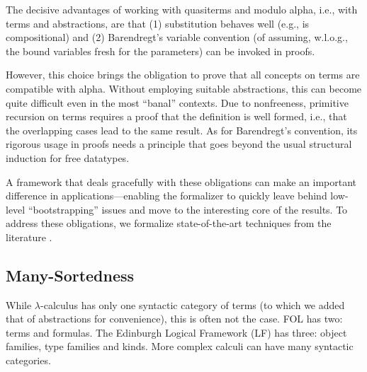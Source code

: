 \documentclass{llncs}
\begin{document}
The decisive advantages of working 
with quasiterms and \abstractions{} modulo alpha, i.e., with terms and abstractions, 
are that 
(1) substitution behaves well (e.g., is compositional) 
and 
(2) Barendregt's variable convention \cite{bar-lam} (of assuming, w.l.o.g.,   
the bound variables fresh for the parameters) can be invoked in proofs. 

%
However, this choice brings the obligation to prove that all concepts on terms 
are compatible with alpha. Without employing suitable abstractions, 
this can become quite difficult 
even in the most ``banal'' contexts. %
Due to nonfreeness, primitive recursion 
on terms requires a proof that the definition is well formed, i.e., that the overlapping 
cases lead to the same result. %
%
As for Barendregt's convention, its rigorous usage in %
proofs needs a principle that goes 
beyond the usual structural induction for free datatypes. 

A framework that deals gracefully with these obligations can make an important 
difference in applications---enabling the formalizer to quickly leave behind low-level ``bootstrapping'' issues 
and move to the interesting core of the results. 
To address these obligations, we formalize %
state-of-the-art techniques from the literature \cite{pitts-AlphaStructural,UrbanTasson,pop-recPrin}. 



%


\subsection{Many-Sortedness} \label{prel-manySorted}

While $\lambda$-calculus has only one syntactic category of terms (to which we 
added that of abstractions for convenience), this is often not the case. %
FOL has two: %
terms and formulas. The Edinburgh Logical Framework (LF) \cite{har-fra} has three: 
object families, type families and kinds. More complex calculi %
can have many syntactic categories. 
\end{document}
